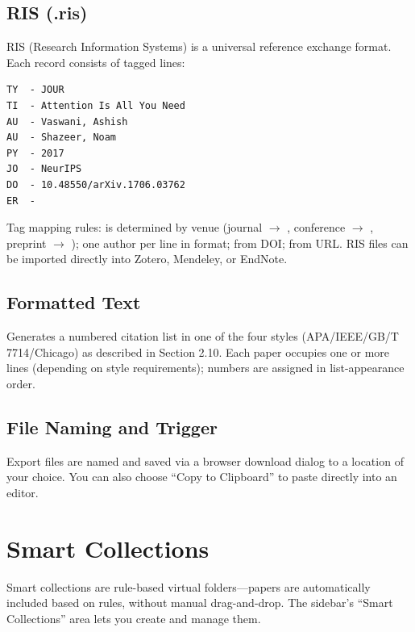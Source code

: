 \subsection{RIS (.ris)}

RIS (Research Information Systems) is a universal reference exchange format. Each
record consists of tagged lines:

\begin{verbatim}
TY  - JOUR
TI  - Attention Is All You Need
AU  - Vaswani, Ashish
AU  - Shazeer, Noam
PY  - 2017
JO  - NeurIPS
DO  - 10.48550/arXiv.1706.03762
ER  -
\end{verbatim}

Tag mapping rules:  is determined by venue (journal $\to$ ,
conference $\to$ , preprint $\to$ );  one author per
line in  format;  from DOI;  from URL.
RIS files can be imported directly into Zotero, Mendeley, or EndNote.

\subsection{Formatted Text}

Generates a numbered citation list in one of the four styles (APA/IEEE/GB/T 7714/Chicago)
as described in Section 2.10. Each paper occupies one or more lines (depending on
style requirements); numbers are assigned in list-appearance order.

\subsection{File Naming and Trigger}

Export files are named  and saved via a browser
download dialog to a location of your choice. You can also choose ``Copy to Clipboard''
to paste directly into an editor.

\section{Smart Collections}

Smart collections are rule-based virtual folders---papers are automatically included
based on rules, without manual drag-and-drop. The sidebar's ``Smart Collections''
area lets you create and manage them.


